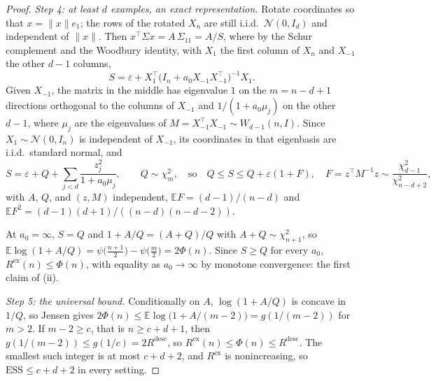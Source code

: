 \documentclass[10pt]{article}
\newcommand{\ess}{\mathrm{ESS}}
\newcommand{\E}{\mathbb{E}}
\begin{document}
\begin{proof}
\emph{Step 4: at least $d$ examples, an exact representation.} Rotate coordinates so that $x = \|x\| e_1$; the rows of the rotated $X_n$ are still i.i.d.\ $\mathcal{N}(0, I_d)$ and independent of $\|x\|$. Then $x^\top \Sigma x = A\,\Sigma_{11} = A/S$, where by the Schur complement and the Woodbury identity, with $X_1$ the first column of $X_n$ and $X_{-1}$ the other $d-1$ columns,
\[
S = \varepsilon + X_1^\top \big(I_n + a_0 X_{-1} X_{-1}^\top\big)^{-1} X_1 .
\]
Given $X_{-1}$, the matrix in the middle has eigenvalue $1$ on the $m = n - d + 1$ directions orthogonal to the columns of $X_{-1}$ and $1/(1 + a_0 \mu_j)$ on the other $d - 1$, where $\mu_j$ are the eigenvalues of $M = X_{-1}^\top X_{-1} \sim W_{d-1}(n, I)$. Since $X_1 \sim \mathcal{N}(0, I_n)$ is independent of $X_{-1}$, its coordinates in that eigenbasis are i.i.d.\ standard normal, and
\[
S = \varepsilon + Q + \sum_{j < d} \frac{z_j^2}{1 + a_0 \mu_j}, \qquad Q \sim \chi^2_m,
\quad\text{so}\quad
Q \le S \le Q + \varepsilon (1 + F), \quad F = z^\top M^{-1} z \sim \frac{\chi^2_{d-1}}{\chi^2_{n-d+2}},
\]
with $A$, $Q$, and $(z, M)$ independent, $\E F = (d-1)/(n-d)$ and $\E F^2 = (d-1)(d+1)/((n-d)(n-d-2))$.

At $a_0 = \infty$, $S = Q$ and $1 + A/Q = (A + Q)/Q$ with $A + Q \sim \chi^2_{n+1}$, so $\E \log(1 + A/Q) = \psi\big(\tfrac{n+1}{2}\big) - \psi\big(\tfrac{m}{2}\big) = 2\Phi(n)$. Since $S \ge Q$ for every $a_0$, $R^{\mathrm{ex}}(n) \le \Phi(n)$, with equality as $a_0 \to \infty$ by monotone convergence: the first claim of (ii).

\emph{Step 5: the universal bound.} Conditionally on $A$, $\log(1 + A/Q)$ is concave in $1/Q$, so Jensen gives $2\Phi(n) \le \E \log\big(1 + A/(m-2)\big) = g(1/(m-2))$ for $m > 2$. If $m - 2 \ge c$, that is $n \ge c + d + 1$, then $g(1/(m-2)) \le g(1/c) = 2R^{\mathrm{desc}}$, so $R^{\mathrm{ex}}(n) \le \Phi(n) \le R^{\mathrm{desc}}$. The smallest such integer is at most $c + d + 2$, and $R^{\mathrm{ex}}$ is nonincreasing, so $\ess \le c + d + 2$ in every setting.


\end{proof}
\end{document}
